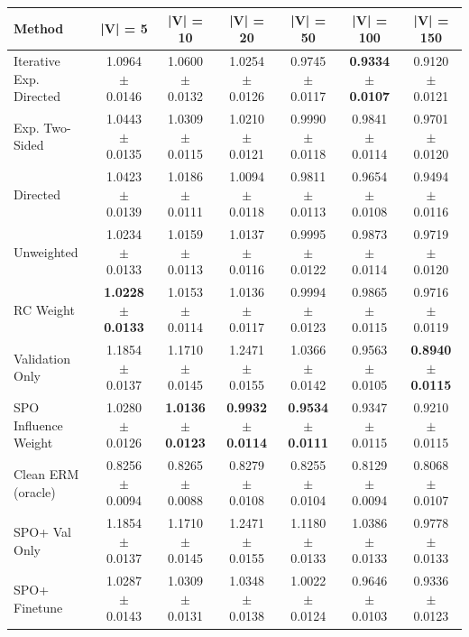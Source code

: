 \begin{tabular}{lcccccc}
\toprule
Method & |V| = 5 & |V| = 10 & |V| = 20 & |V| = 50 & |V| = 100 & |V| = 150 \\
\midrule
Iterative Exp. Directed & 1.0964 $\pm$ 0.0146 & 1.0600 $\pm$ 0.0132 & 1.0254 $\pm$ 0.0126 & 0.9745 $\pm$ 0.0117 & \textbf{0.9334 $\pm$ 0.0107} & 0.9120 $\pm$ 0.0121 \\
Exp. Two-Sided & 1.0443 $\pm$ 0.0135 & 1.0309 $\pm$ 0.0115 & 1.0210 $\pm$ 0.0121 & 0.9990 $\pm$ 0.0118 & 0.9841 $\pm$ 0.0114 & 0.9701 $\pm$ 0.0120 \\
Directed & 1.0423 $\pm$ 0.0139 & 1.0186 $\pm$ 0.0111 & 1.0094 $\pm$ 0.0118 & 0.9811 $\pm$ 0.0113 & 0.9654 $\pm$ 0.0108 & 0.9494 $\pm$ 0.0116 \\
Unweighted & 1.0234 $\pm$ 0.0133 & 1.0159 $\pm$ 0.0113 & 1.0137 $\pm$ 0.0116 & 0.9995 $\pm$ 0.0122 & 0.9873 $\pm$ 0.0114 & 0.9719 $\pm$ 0.0120 \\
RC Weight & \textbf{1.0228 $\pm$ 0.0133} & 1.0153 $\pm$ 0.0114 & 1.0136 $\pm$ 0.0117 & 0.9994 $\pm$ 0.0123 & 0.9865 $\pm$ 0.0115 & 0.9716 $\pm$ 0.0119 \\
Validation Only & 1.1854 $\pm$ 0.0137 & 1.1710 $\pm$ 0.0145 & 1.2471 $\pm$ 0.0155 & 1.0366 $\pm$ 0.0142 & 0.9563 $\pm$ 0.0105 & \textbf{0.8940 $\pm$ 0.0115} \\
SPO Influence Weight & 1.0280 $\pm$ 0.0126 & \textbf{1.0136 $\pm$ 0.0123} & \textbf{0.9932 $\pm$ 0.0114} & \textbf{0.9534 $\pm$ 0.0111} & 0.9347 $\pm$ 0.0115 & 0.9210 $\pm$ 0.0115 \\
Clean ERM (oracle) & 0.8256 $\pm$ 0.0094 & 0.8265 $\pm$ 0.0088 & 0.8279 $\pm$ 0.0108 & 0.8255 $\pm$ 0.0104 & 0.8129 $\pm$ 0.0094 & 0.8068 $\pm$ 0.0107 \\
SPO+ Val Only & 1.1854 $\pm$ 0.0137 & 1.1710 $\pm$ 0.0145 & 1.2471 $\pm$ 0.0155 & 1.1180 $\pm$ 0.0133 & 1.0386 $\pm$ 0.0133 & 0.9778 $\pm$ 0.0133 \\
SPO+ Finetune & 1.0287 $\pm$ 0.0143 & 1.0309 $\pm$ 0.0131 & 1.0348 $\pm$ 0.0138 & 1.0022 $\pm$ 0.0124 & 0.9646 $\pm$ 0.0103 & 0.9336 $\pm$ 0.0123 \\
\bottomrule
\end{tabular}
